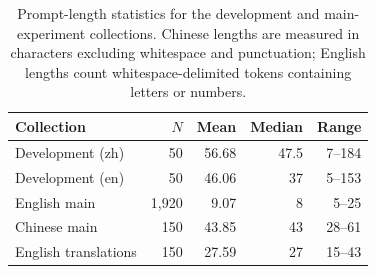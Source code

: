 \begin{table}[t]
\centering
\caption{Prompt-length statistics for the development and main-experiment collections. Chinese lengths are measured in characters excluding whitespace and punctuation; English lengths count whitespace-delimited tokens containing letters or numbers.}
\label{tab:prompt_length_statistics}
\footnotesize
\setlength{\tabcolsep}{2pt}
\renewcommand{\arraystretch}{1.12}
\begin{tabular*}{\columnwidth}{@{\extracolsep{\fill}}lrrrr@{}}
\toprule
\textbf{Collection} & \textbf{$N$} & \textbf{Mean} & \textbf{Median} & \textbf{Range} \\
\midrule
Development (zh) & 50 & 56.68 & 47.5 & 7--184 \\
Development (en) & 50 & 46.06 & 37 & 5--153 \\
English main & 1,920 & 9.07 & 8 & 5--25 \\
Chinese main & 150 & 43.85 & 43 & 28--61 \\
English translations & 150 & 27.59 & 27 & 15--43 \\
\bottomrule
\end{tabular*}
\end{table}
